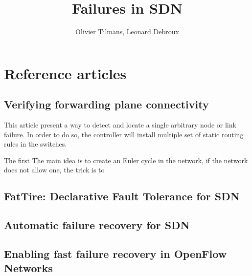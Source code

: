 \documentclass[11pt,a4paper]{article}
\author{Olivier Tilmans, Leonard Debroux}
\title{Failures in SDN}
\begin{document}
\section{Reference articles}
\subsection{Verifying forwarding plane connectivity}
This article present a way to detect and locate a single arbitrary node or link failure.
In order to do so, the controller will install multiple set of static routing rules in the switches.

The first
The main idea is to create an Euler cycle in the network, if the network does not allow one, the trick is to 
\subsection{FatTire: Declarative Fault Tolerance for SDN}

\subsection{Automatic failure recovery for SDN}

\subsection{Enabling fast failure recovery in OpenFlow Networks}
\end{document}
